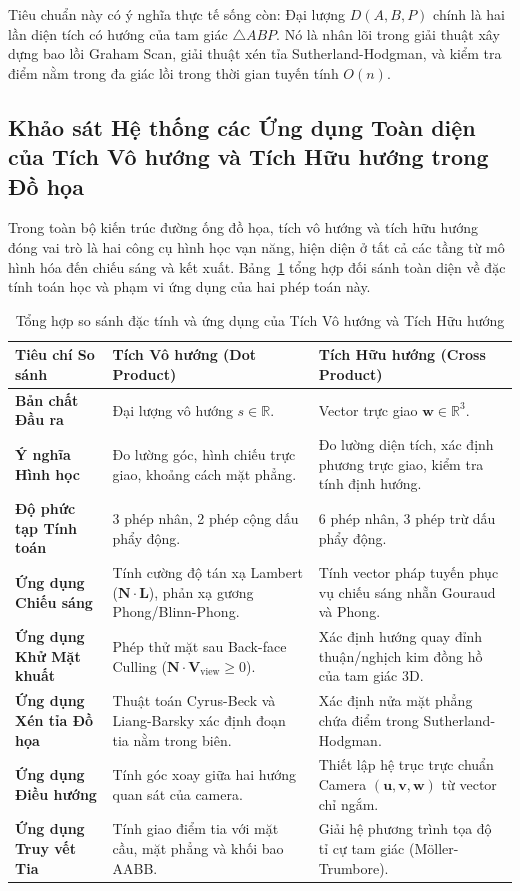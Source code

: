 Tiêu chuẩn này có ý nghĩa thực tế sống còn: Đại lượng $D(A, B, P)$ chính là hai lần diện tích có hướng của tam giác $\triangle ABP$. Nó là nhân lõi trong giải thuật xây dựng bao lồi Graham Scan, giải thuật xén tỉa Sutherland-Hodgman, và kiểm tra điểm nằm trong đa giác lồi trong thời gian tuyến tính $O(n)$.

\subsection{Khảo sát Hệ thống các Ứng dụng Toàn diện của Tích Vô hướng và Tích Hữu hướng trong Đồ họa}
\label{subsec:systematic_dot_cross_applications}

Trong toàn bộ kiến trúc đường ống đồ họa, tích vô hướng và tích hữu hướng đóng vai trò là hai công cụ hình học vạn năng, hiện diện ở tất cả các tầng từ mô hình hóa đến chiếu sáng và kết xuất. Bảng~\ref{tab:vector_products_comparison} tổng hợp đối sánh toàn diện về đặc tính toán học và phạm vi ứng dụng của hai phép toán này.

\begin{table}[ht]
\centering
\small
\caption{Tổng hợp so sánh đặc tính và ứng dụng của Tích Vô hướng và Tích Hữu hướng}
\label{tab:vector_products_comparison}
\renewcommand{\arraystretch}{1.3}
\begin{tabularx}{\textwidth}{|p{3.2cm}|X|X|}
\hline
\textbf{Tiêu chí So sánh} & \textbf{Tích Vô hướng (Dot Product)} & \textbf{Tích Hữu hướng (Cross Product)} \\
\hline
\textbf{Bản chất Đầu ra} & Đại lượng vô hướng $s \in \mathbb{R}$. & Vector trực giao $\mathbf{w} \in \mathbb{R}^3$. \\
\hline
\textbf{Ý nghĩa Hình học} & Đo lường góc, hình chiếu trực giao, khoảng cách mặt phẳng. & Đo lường diện tích, xác định phương trực giao, kiểm tra tính định hướng. \\
\hline
\textbf{Độ phức tạp Tính toán} & 3 phép nhân, 2 phép cộng dấu phẩy động. & 6 phép nhân, 3 phép trừ dấu phẩy động. \\
\hline
\textbf{Ứng dụng Chiếu sáng} & Tính cường độ tán xạ Lambert ($\mathbf{N} \cdot \mathbf{L}$), phản xạ gương Phong/Blinn-Phong. & Tính vector pháp tuyến phục vụ chiếu sáng nhẵn Gouraud và Phong. \\
\hline
\textbf{Ứng dụng Khử Mặt khuất} & Phép thử mặt sau Back-face Culling ($\mathbf{N} \cdot \mathbf{V}_{\text{view}} \ge 0$). & Xác định hướng quay đỉnh thuận/nghịch kim đồng hồ của tam giác 3D. \\
\hline
\textbf{Ứng dụng Xén tỉa Đồ họa} & Thuật toán Cyrus-Beck và Liang-Barsky xác định đoạn tia nằm trong biên. & Xác định nửa mặt phẳng chứa điểm trong Sutherland-Hodgman. \\
\hline
\textbf{Ứng dụng Điều hướng} & Tính góc xoay giữa hai hướng quan sát của camera. & Thiết lập hệ trục trực chuẩn Camera $(\mathbf{u}, \mathbf{v}, \mathbf{w})$ từ vector chỉ ngắm. \\
\hline
\textbf{Ứng dụng Truy vết Tia} & Tính giao điểm tia với mặt cầu, mặt phẳng và khối bao AABB. & Giải hệ phương trình tọa độ tỉ cự tam giác (Möller-Trumbore). \\
\hline
\end{tabularx}
\end{table}

